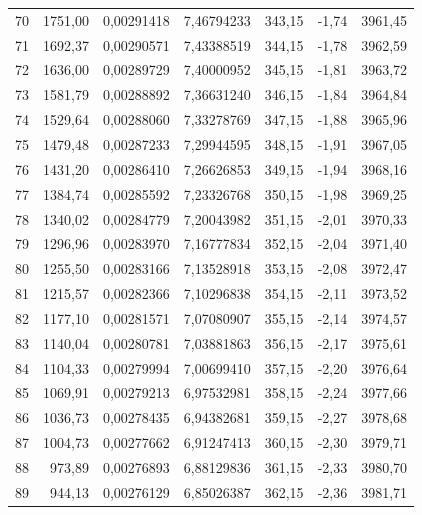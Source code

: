\documentclass[12pt,a4paper,final,twoside,fleqn]{article}
\begin{document}
\begin{ThreePartTable}
\begin{longtable}{rrrrrrr}
70           & 1751,00   & 0,00291418    & 7,46794233  & 343,15     & -1,74      & 3961,45 \\
71           & 1692,37   & 0,00290571    & 7,43388519  & 344,15     & -1,78      & 3962,59 \\
72           & 1636,00   & 0,00289729    & 7,40000952  & 345,15     & -1,81      & 3963,72 \\
73           & 1581,79   & 0,00288892    & 7,36631240  & 346,15     & -1,84      & 3964,84 \\
74           & 1529,64   & 0,00288060    & 7,33278769  & 347,15     & -1,88      & 3965,96 \\
75           & 1479,48   & 0,00287233    & 7,29944595  & 348,15     & -1,91      & 3967,05 \\
76           & 1431,20   & 0,00286410    & 7,26626853  & 349,15     & -1,94      & 3968,16 \\
77           & 1384,74   & 0,00285592    & 7,23326768  & 350,15     & -1,98      & 3969,25 \\
78           & 1340,02   & 0,00284779    & 7,20043982  & 351,15     & -2,01      & 3970,33 \\
79           & 1296,96   & 0,00283970    & 7,16777834  & 352,15     & -2,04      & 3971,40 \\
80           & 1255,50   & 0,00283166    & 7,13528918  & 353,15     & -2,08      & 3972,47 \\
81           & 1215,57   & 0,00282366    & 7,10296838  & 354,15     & -2,11      & 3973,52 \\
82           & 1177,10   & 0,00281571    & 7,07080907  & 355,15     & -2,14      & 3974,57 \\
83           & 1140,04   & 0,00280781    & 7,03881863  & 356,15     & -2,17      & 3975,61 \\
84           & 1104,33   & 0,00279994    & 7,00699410  & 357,15     & -2,20      & 3976,64 \\
85           & 1069,91   & 0,00279213    & 6,97532981  & 358,15     & -2,24      & 3977,66 \\
86           & 1036,73   & 0,00278435    & 6,94382681  & 359,15     & -2,27      & 3978,68 \\
87           & 1004,73   & 0,00277662    & 6,91247413  & 360,15     & -2,30      & 3979,71 \\
88           & 973,89    & 0,00276893    & 6,88129836  & 361,15     & -2,33      & 3980,70 \\
89           & 944,13    & 0,00276129    & 6,85026387  & 362,15     & -2,36      & 3981,71 \\

\end{longtable}
\end{ThreePartTable}
\end{document}
